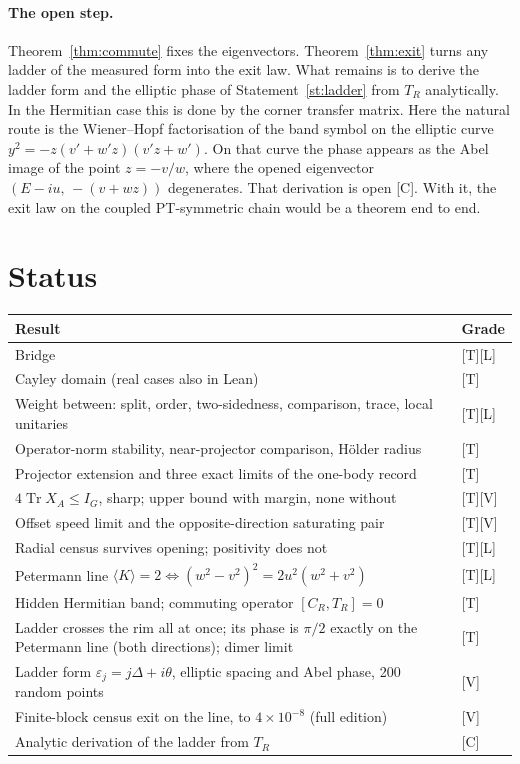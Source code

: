 \documentclass[11pt]{article}
\theoremstyle{definition}
\newcommand{\grade}[1]{\textsf{\small[#1]}}
\newcommand{\Tr}{\operatorname{Tr}}
\begin{document}
\paragraph{The open step.} Theorem~\ref{thm:commute} fixes the eigenvectors. Theorem~\ref{thm:exit} turns any ladder of the measured form into the exit law. What remains is to derive the ladder form and the elliptic phase of Statement~\ref{st:ladder} from $T_R$ analytically. In the Hermitian case this is done by the corner transfer matrix. Here the natural route is the Wiener--Hopf factorisation of the band symbol on the elliptic curve $y^2=-z(v'+w'z)(v'z+w')$. On that curve the phase appears as the Abel image of the point $z=-v/w$, where the opened eigenvector $(E-iu,\,-(v+wz))$ degenerates. That derivation is open \grade{C}. With it, the exit law on the coupled PT-symmetric chain would be a theorem end to end.

\section{Status}\label{sec:status}
\begin{center}\small
\begin{tabular}{p{}l}\toprule
Result & Grade\\\midrule
Bridge & \grade{T}\grade{L}\\
Cayley domain (real cases also in Lean) & \grade{T}\\
Weight between: split, order, two-sidedness, comparison, trace, local unitaries & \grade{T}\grade{L}\\
Operator-norm stability, near-projector comparison, Hölder radius & \grade{T}\\
Projector extension and three exact limits of the one-body record & \grade{T}\\
$4\Tr X_A\le I_G$, sharp; upper bound with margin, none without & \grade{T}\grade{V}\\
Offset speed limit and the opposite-direction saturating pair & \grade{T}\grade{V}\\
Radial census survives opening; positivity does not & \grade{T}\grade{L}\\
Petermann line $\langle K\rangle=2\iff(w^2-v^2)^2=2u^2(w^2+v^2)$ & \grade{T}\grade{L}\\
Hidden Hermitian band; commuting operator $[C_R,T_R]=0$ & \grade{T}\\
Ladder crosses the rim all at once; its phase is $\pi/2$ exactly on the Petermann line (both directions); dimer limit & \grade{T}\\
Ladder form $\varepsilon_j=j\Delta+i\theta$, elliptic spacing and Abel phase, 200 random points & \grade{V}\\
Finite-block census exit on the line, to $4\times10^{-8}$ (full edition) & \grade{V}\\
Analytic derivation of the ladder from $T_R$ & \grade{C}\\\bottomrule
\end{tabular}
\end{center}
\end{document}

